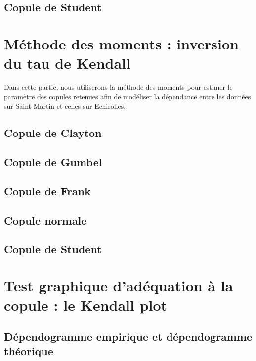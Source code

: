 \subsection{Copule de Student}



\section{Méthode des moments : inversion du tau de Kendall}

Dans cette partie, nous utiliserons la méthode des moments pour estimer le paramètre des copules retenues afin de modéliser la dépendance entre les données sur Saint-Martin et celles sur Echirolles.

\subsection{Copule de Clayton}

\subsection{Copule de Gumbel}

\subsection{Copule de Frank}

\subsection{Copule normale}

\subsection{Copule de Student}

\section{Test graphique d'adéquation à la copule : le Kendall plot}

\subsection{Dépendogramme empirique et dépendogramme théorique}

